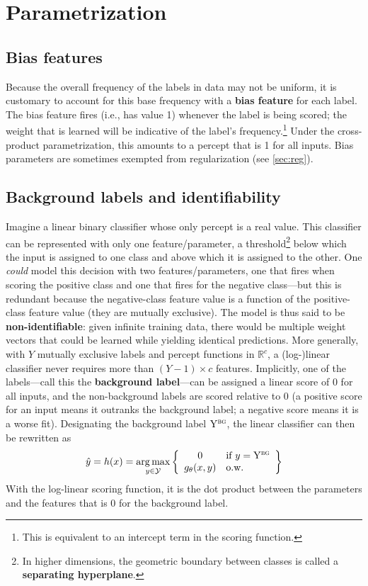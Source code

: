 \documentclass[11pt,letterpaper]{article}
\DeclareMathOperator*{\argmax}{arg\,max}
\newcommand{\params}{\mathbf{\theta}}
\begin{document}
\section{Parametrization}\label{sec:param}

\subsection{Bias features}\label{sec:bias}

Because the overall frequency of the labels in data may not be uniform, 
it is customary to account for this base frequency with a {\bf bias feature} 
for each label. The bias feature fires (i.e., has value 1) whenever 
the label is being scored; the weight that is learned will be indicative of 
the label's frequency.\footnote{This is equivalent to an intercept term in the scoring function.} 
Under the cross-product parametrization, this amounts to a percept that is 1 for all inputs.
Bias parameters are sometimes exempted from regularization (see \cref{sec:reg}).

\subsection{Background labels and identifiability}\label{sec:bg}

Imagine a linear binary classifier whose only percept is a real value. 
This classifier can be represented with only one feature/parameter, a threshold\footnote{In higher dimensions, the geometric boundary between classes is called a {\bf separating hyperplane}.}
below which the input is assigned to one class and above which it is assigned to the other.
One {\em could} model this decision with two features/parameters, one that fires when scoring the positive class 
and one that fires for the negative class---but this is redundant because the negative-class feature value
is a function of the positive-class feature value (they are mutually exclusive).
The model is thus said to be {\bf non-identifiable}: given infinite training data, there would be multiple 
weight vectors that could be learned while yielding identical predictions.
More generally, with $Y$ mutually exclusive labels and percept functions in $\mathbb{R}^c$, a \mbox{(log-)linear} classifier 
never requires more than $(Y-1) \times c$ features. 
Implicitly, one of the labels---call this the {\bf background label}---can be assigned a linear score of 0 for all inputs, 
and the non-background labels are scored relative to 0 (a positive score for an input means it outranks the background label; 
a negative score means it is a worse fit). 
Designating the background label $\mathrm{Y}^{\textsc{bg}}$, the linear classifier can then be rewritten as
\begin{equation}\label{eq:classifier-bg}
\hat{y} = h(x) = \argmax_{y\in\mathcal{Y}} \left\{\begin{array}{cl}
0 & \text{if }y=\mathrm{Y}^{\textsc{bg}} \\
g_\params(x,y) & \text{o.w.}\end{array}\right\}
\end{equation}
With the log-linear scoring function, it is the dot product between the parameters and the features that is 0 for the background label.
\end{document}
